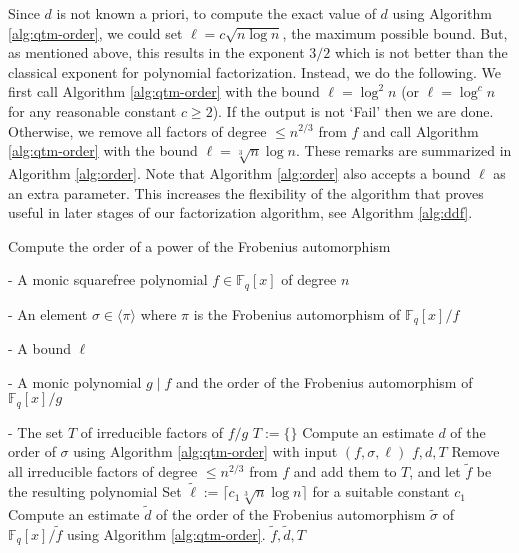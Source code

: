 \documentclass[11pt]{article}
\theoremstyle{plain}
\theoremstyle{definition}
\newcommand{\algbox}[1]{
	\begin{tcolorbox}[width = \textwidth, colback = white, arc = 2pt, boxrule = 0.5pt] 
		#1 
	\end{tcolorbox}
}
\newcommand{\lrang}[1]{\langle#1\rangle}
\def\F{\ensuremath{\mathbb{F}}}
\begin{document}
Since $d$ is not known a priori, to compute the exact value of $d$ using Algorithm 
\ref{alg:qtm-order}, we could set $\ell = c\sqrt{n \log n}$, the maximum possible bound. But, as 
mentioned above, this results in the exponent $3 / 2$ which is not better than the classical 
exponent for polynomial factorization. Instead, we do the following. We first call Algorithm 
\ref{alg:qtm-order} with the bound $\ell = \log^2n$ (or $\ell = \log^cn$ for any reasonable constant 
$c \ge 2$). If the output is not `Fail' then we are done. Otherwise, we remove all factors of degree 
$\le n^{2 / 3}$ from $f$ and call Algorithm \ref{alg:qtm-order} with the bound $\ell = \sqrt[3]{n} 
\log n$. These remarks are summarized in Algorithm \ref{alg:order}. Note that Algorithm 
\ref{alg:order} also accepts a bound $\ell$ as an extra parameter. This increases the flexibility 
of the algorithm that proves useful in later stages of our factorization algorithm, see Algorithm 
\ref{alg:ddf}.

\begin{algorithm}[t]
	\caption{Compute the order of a power of the Frobenius automorphism}
	\label{alg:order}
	\centering
	\algbox{
	\begin{algorithmic}[1]
		\Require 
		\item[-] A monic squarefree polynomial $f \in \F_q[x]$ of degree $n$
		\item[-] An element $\sigma \in \lrang{\pi}$ where $\pi$ is the Frobenius automorphism of 
		$\F_q[x] / f$
		\item[-] A bound $\ell$
		\Ensure 
		\item[-] A monic polynomial $g \mid f$ and the order of the Frobenius automorphism of 
		$\F_q[x] / g$
		\item[-] The set $T$ of irreducible factors of $f / g$
		\State $T := \{\}$
		\State Compute an estimate $d$ of the order of $\sigma$ using Algorithm \ref{alg:qtm-order} 
		with input $(f, \sigma, \ell)$
		\If {the output is not `Fail'}
			\State \Return $f, d, T$
		\EndIf
		\State Remove all irreducible factors of degree $\le n^{2 / 3}$ from $f$ and add them to 
		$T$, and let $\tilde{f}$ be the resulting polynomial
		\State Set $\tilde{\ell} := \lceil c_1\sqrt[3]{n} \log n \rceil$ for a suitable constant 
		$c_1$
		\State Compute an estimate $\tilde{d}$ of the order of the Frobenius automorphism 
		$\tilde{\sigma}$ of $\F_q[x] / \tilde{f}$ using Algorithm \ref{alg:qtm-order}.
		\State \Return $\tilde{f}, \tilde{d}, T$
	\end{algorithmic}}
\end{algorithm}
\end{document}
